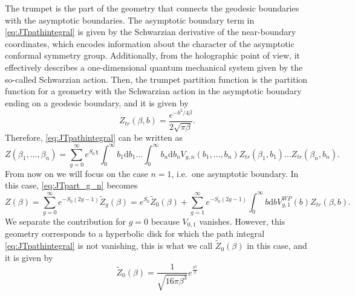 \documentclass[a4paper,11pt]{article}
\newcommand{\rmd}{\mathrm{d}}
\begin{document}
The trumpet is the part of the geometry that connects the geodesic boundaries with the asymptotic boundaries. The asymptotic boundary term in \eqref{eq:JTpathintegral} is given by the Schwarzian derivative of the near-boundary coordinates, which encodes information about the character of the asymptotic conformal symmetry group. Additionally, from the holographic point of view, it effectively describes a one-dimensional quantum mechanical system given by the so-called Schwarzian action. Then, the trumpet partition function is the partition function for a geometry with the Schwarzian action in the asymptotic boundary ending on a geodesic boundary, and it is given by
\begin{equation}
    Z_{tr}(\beta,b)=\frac{e^{-b^2/4\beta}}{2\sqrt{\pi \beta}}.
\end{equation}
Therefore, \eqref{eq:JTpathintegral} can be written as 
\begin{equation}
    Z(\beta_1,\dots,\beta_n)=\sum_{g=0}^\infty e^{S_0 \chi}\int_0^\infty b_1 \rmd b_1 \dots \int_0^\infty b_n\rmd b_n V_{g,n}(b_1,\dots,b_n)Z_{tr}(\beta_1,b_1)\dots Z_{tr}(\beta_n,b_n).\label{eq:JTpart_g_n}
\end{equation}
From now on we will focus on the case $n=1$, i.e.\ one asymptotic boundary. In this case, \eqref{eq:JTpart_g_n} becomes 
\begin{equation}
    Z(\beta)=\sum_{g=0}^\infty e^{-S_0(2g-1)} \tilde{Z}_g(\beta)= e^{S_0} \tilde{Z}_0(\beta) + \sum_{g=1}^\infty e^{-S_0(2g-1)}\int_0^\infty b\rmd b V^{WP}_{g,1}(b)Z_{tr}(\beta,b).
\end{equation}
We separate the contribution for $g=0$ because $V_{0,1}$ vanishes. However, this geometry corresponds to a hyperbolic disk for which the path integral \eqref{eq:JTpathintegral} is not vanishing, this is what we call $\tilde{Z}_0(\beta)$ in this case, and it is given by \cite{Saad:2019lba}
\begin{equation}
    \tilde{Z}_0(\beta)=\frac{1}{\sqrt{16\pi\beta^3}}e^{\frac{\pi^2}{\beta}}
\end{equation}
\end{document}

